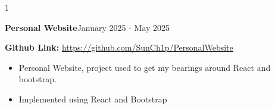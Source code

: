 \documentclass[11pt]{article}
\newcommand{\project}[4]{
    \noindent \textbf{#1}\normalsize \hfill #2
    \par
    \noindent #3
    #4
}
\begin{document}
\begin{spacing}{1}
{\begin{itemize}
            \end{itemize}
            \par
        }
        \project{Personal Website}{January 2025 - May 2025}{\textbf{Github Link:} \url{https://github.com/SunCh1p/PersonalWebsite}}
        {
            \begin{itemize}
                \setlength\itemsep{0.01em}
                \item Personal Website, project used to get my bearings around React and bootstrap.
                \item Implemented using React and Bootstrap\par
            \end{itemize}
            \par
        }
    \end{spacing}
\end{document}
